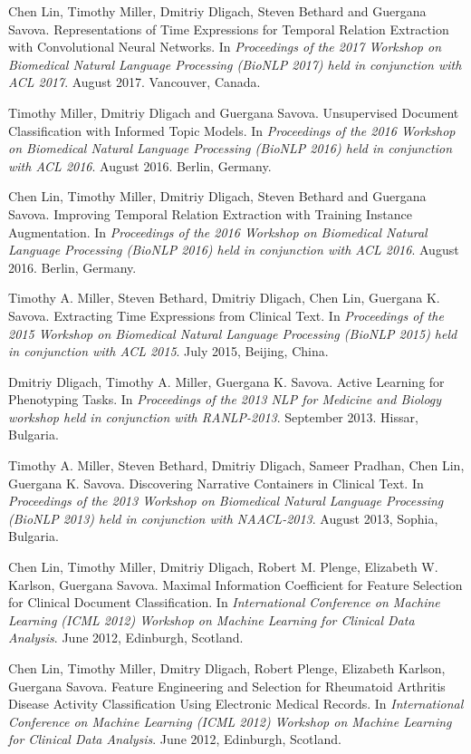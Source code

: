 \documentclass[letterpaper]{article}
\renewenvironment{itemize}{
  \begin{list}{}{
    \setlength{\leftmargin}{1.5em}
  }
}{
  \end{list}
}
\begin{document}
\begin{itemize}
\item Chen Lin, Timothy Miller, Dmitriy Dligach, Steven Bethard and Guergana Savova. Representations of Time Expressions for Temporal Relation Extraction with Convolutional Neural Networks. In \emph{Proceedings of the 2017 Workshop on Biomedical Natural Language Processing (BioNLP 2017) held in conjunction with ACL 2017}. August 2017. Vancouver, Canada.
\item Timothy Miller, Dmitriy Dligach and Guergana Savova. Unsupervised Document Classification with Informed Topic Models. In \emph{Proceedings of the 2016 Workshop on Biomedical Natural Language Processing (BioNLP 2016) held in conjunction with ACL 2016}. August 2016. Berlin, Germany.
\item Chen Lin, Timothy Miller, Dmitriy Dligach, Steven Bethard and Guergana Savova. Improving Temporal Relation Extraction with Training Instance Augmentation. In \emph{Proceedings of the 2016 Workshop on Biomedical Natural Language Processing (BioNLP 2016) held in conjunction with ACL 2016}. August 2016. Berlin, Germany.
\item Timothy A. Miller, Steven Bethard, Dmitriy Dligach, Chen Lin, Guergana K. Savova. Extracting Time Expressions from Clinical Text. In \emph{Proceedings of the 2015 Workshop on Biomedical Natural Language Processing (BioNLP 2015) held in conjunction with ACL 2015}. July 2015, Beijing, China.
\item Dmitriy Dligach, Timothy A. Miller, Guergana K. Savova. Active Learning for Phenotyping Tasks. In \emph{Proceedings of the 2013 NLP for Medicine and Biology workshop held in conjunction with RANLP-2013}. September 2013. Hissar, Bulgaria.
\item Timothy A. Miller, Steven Bethard, Dmitriy Dligach, Sameer Pradhan, Chen Lin, Guergana K. Savova. Discovering Narrative Containers in Clinical Text. In \emph{Proceedings of the 2013 Workshop on Biomedical Natural Language Processing (BioNLP 2013) held in conjunction with NAACL-2013}. August 2013, Sophia, Bulgaria.
\item Chen Lin, Timothy Miller, Dmitriy Dligach, Robert M. Plenge, Elizabeth W. Karlson, Guergana Savova. Maximal Information Coefficient for Feature Selection for Clinical Document Classification. In \emph{International Conference on Machine Learning (ICML 2012) Workshop on Machine Learning for Clinical Data Analysis}. June 2012, Edinburgh, Scotland.
\item Chen Lin, Timothy Miller, Dmitry Dligach, Robert Plenge, Elizabeth Karlson, Guergana Savova. Feature Engineering and Selection for Rheumatoid Arthritis Disease Activity Classification Using Electronic Medical Records. In \emph{International Conference on Machine Learning (ICML 2012) Workshop on Machine Learning for Clinical Data Analysis}. June 2012, Edinburgh, Scotland.

\end{itemize}
\end{document}
